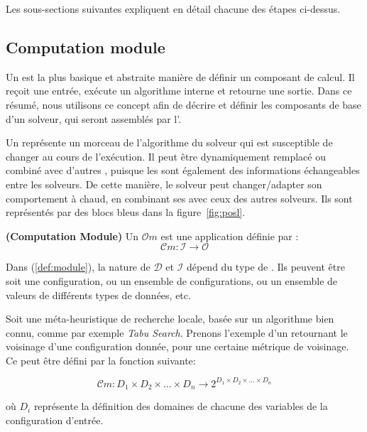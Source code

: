 Les sous-sections suivantes expliquent en détail chacune des étapes ci-dessus.

\subsection{Computation module}

Un \om{}  est la plus basique  et abstraite manière de définir un composant de calcul. Il reçoit une entrée, exécute un algorithme interne et retourne une sortie. Dans ce résumé, nous utilisons ce concept afin de décrire et définir les composants de base d'un  solveur, qui seront assemblés par l'\as.  

Un \om{} représente un  morceau de l'algorithme du solveur  qui est susceptible de changer au cours de  l'exécution. Il peut être dynamiquement remplacé  ou combiné avec d'autres  \oms, puisque les \oms{} sont également des informations  échangeables  entre  les solveurs. De cette manière, le solveur  peut changer/adapter son comportement à chaud, en combinant  ses \oms{} avec ceux  des autres solveurs. Ils sont  représentés par  des blocs  bleus dans  la figure~\ref{fig:posl}.

\begin{lemma}\label{def:module} \textbf{(Computation Module)}
Un \om{} $\mathcal{O}m$ est une application définie par :
\begin{equation}
 \mathcal{C}m:\mathcal{I} \rightarrow \mathcal{O}
\end{equation}
\end{lemma}

Dans (\ref{def:module}),  la nature de $\mathcal{D}$  et $\mathcal{I}$ dépend du type de \om{}. Ils peuvent être soit une configuration, ou un  ensemble de configurations, ou un ensemble de valeurs de différents types de données, etc.

Soit une méta-heuristique de recherche locale, basée sur un algorithme bien connu, comme par exemple {\it Tabu Search}. Prenons l'exemple d'un  \om{} retournant le voisinage d'une configuration donnée, pour une certaine métrique de voisinage. Ce \om{} peut être défini par la fonction suivante:

\begin{equation}
\mathcal{C}m:D_1\times D_2\times\dots\times D_n \rightarrow 2^{D_1\times D_2\times\dots\times D_n}
\end{equation}

où $D_i$  représente  la  définition  des  domaines  de  chacune  des variables de la configuration d'entrée.

